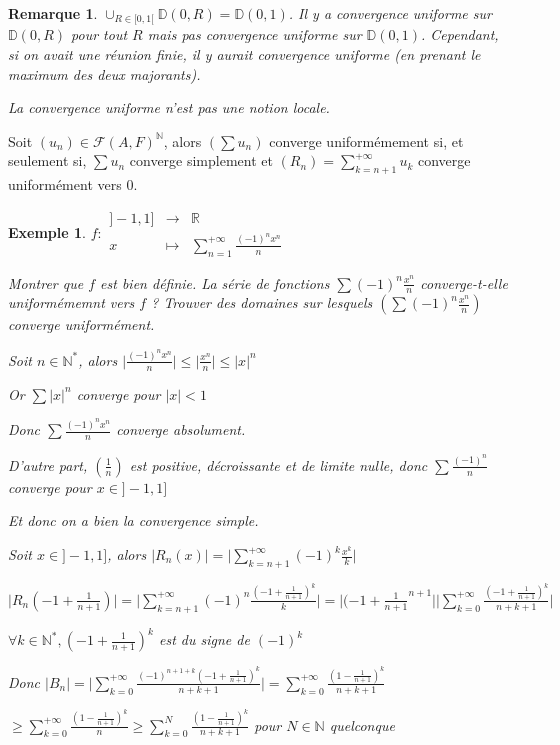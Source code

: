 \documentclass[a4paper,12pt]{book}
\newcommand{\Prop}[2]{\begin{tcolorbox}[sharp corners, colback=white,colframe=red!90!black!75, title=Proposition : #1]#2\end{tcolorbox}}
\newtheorem{Exe}{Exemple}[section]
\newtheorem{Rem}{Remarque}[section]
\def\R{\mathbb{R}}
\def\N{\mathbb{N}}
\begin{document}
\begin{Rem}
$\cup_{R\in[0,1[}\mathbb{D}(0,R)=\mathbb{D}(0,1)$. Il y a convergence uniforme sur $\mathbb{D}(0,R)$ pour tout $R$ mais pas convergence uniforme sur $\mathbb{D}(0,1)$. Cependant, si on avait une réunion finie, il y aurait convergence uniforme (en prenant le maximum des deux majorants). \par La convergence uniforme n'est pas une notion locale.
\end{Rem}
\Prop{}{Soit $(u_n)\in\mathcal{F}(A,F)^\N$, alors $(\sum u_n)$ converge uniformémement si, et seulement si, $\sum u_n$ converge simplement et $(R_n)=\sum\limits_{k=n+1}^{+\infty}u_k$ converge uniformément vers $0$.}
\begin{Exe}
$f:\begin{array}{rcl}]-1,1] & \to & \R \\ x & \mapsto & \sum\limits_{n=1}^{+\infty}\frac{(-1)^nx^n}{n}\end{array}$ \par Montrer que $f$ est bien définie. La série de fonctions $\sum(-1)^n\frac{x^n}{n}$ converge-t-elle uniformémemnt vers $f$ ? Trouver des domaines sur lesquels $(\sum (-1)^n\frac{x^n}{n})$ converge uniformément.
\par Soit $n\in\N^*$, alors $\vert\frac{(-1)^nx^n}{n}\vert\leq\vert\frac{x^n}{n}\vert\leq\vert x\vert^n$ \par Or $\sum\vert x\vert^n$ converge pour $\vert x\vert <1$ \par Donc $\sum\frac{(-1)^nx^n}{n}$ converge absolument. \par D'autre part, $\left(\frac{1}{n}\right)$ est positive, décroissante et de limite nulle, donc $\sum\frac{(-1)^n}{n}$ converge pour $x\in]-1,1]$ \par Et donc on a bien la convergence simple.
\par Soit $x\in]-1,1]$, alors $\vert R_n(x)\vert = \vert\sum\limits_{k=n+1}^{+\infty}(-1)^k\frac{x^k}{k}\vert$ \par $\vert R_n(-1+\frac{1}{n+1})\vert=\vert\sum\limits_{k=n+1}^{+\infty}(-1)^n\frac{(-1+\frac{1}{n+1})^k}{k}\vert = \vert (-1+\frac{1}{n+1}^{n+1}\vert \vert\sum\limits_{k=0}^{+\infty}\frac{(-1+\frac{1}{n+1})^k}{n+k+1}\vert$ \par $\forall k\in\N^*, (-1+\frac{1}{n+1})^k$ est du signe de $(-1)^k$ \par Donc $\vert B_n\vert=\vert \sum\limits_{k=0}^{+\infty}\frac{(-1)^{n+1+k}(-1+\frac{1}{n+1})^k}{n+k+1}\vert= \sum\limits_{k=0}^{+\infty}\frac{(1-\frac{1}{n+1})^k}{n+k+1}$ \par $\geq \sum\limits_{k=0}^{+\infty}\frac{(1-\frac{1}{n+1})^k}{n}\geq \sum\limits_{k=0}^N\frac{(1-\frac{1}{n+1})^k}{n+k+1}$ pour $N\in\N$ quelconque

\end{Exe}
\end{document}
